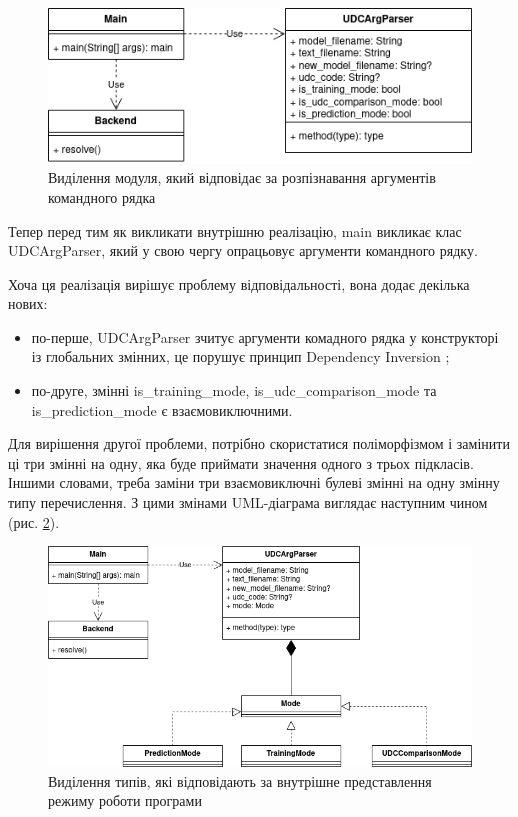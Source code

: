 \documentclass[14pt]{extarticle}
\begin{document}
  \begin{figure}[H]
    \centering
    \includegraphics{io_uml2.drawio.png}    
    \caption{Виділення модуля,
    який відповідає за розпізнавання аргументів командного рядка}
    \label{fig:io_uml2}
  \end{figure}

  Тепер перед тим як викликати внутрішню реалізацію,
  main викликає клас UDCArgParser,
  який у свою чергу опрацьовує аргументи командного рядку.
  
  Хоча ця реалізація вирішує проблему відповідальності, вона додає декілька нових:
  \begin{itemize}[labelindent=\dimexpr{}\relax, leftmargin=*]
    \item по-перше, UDCArgParser зчитує аргументи комадного рядка
    у конструкторі із глобальних змінних,
    це порушує принцип Dependency Inversion \cite{DI_wiki, SOLID_wiki};
    \item по-друге, змінні is\_training\_mode, is\_udc\_comparison\_mode та \\ is\_prediction\_mode є взаємовиключними.
  \end{itemize}

  Для вирішення другої проблеми, потрібно скористатися поліморфізмом
  \cite{Polymorphism_wiki, Subtyping_wiki, Dynamic_dispatch_wiki}
  і замінити ці три змінні на одну,
  яка буде приймати значення одного з трьох підкласів.
  Іншими словами, треба заміни три взаємовиключні булеві змінні
  на одну змінну типу перечислення.
  З цими змінами UML-діаграма виглядає наступним чином (рис. \ref{fig:io_uml3}).

  \begin{figure}[H]
    \centering
    \includegraphics[width=\textwidth]{io_uml3.drawio.png}    
    \caption{Виділення типів,
    які відповідають за внутрішне представлення режиму роботи програми}
    \label{fig:io_uml3}
  \end{figure}
  
\end{document}

